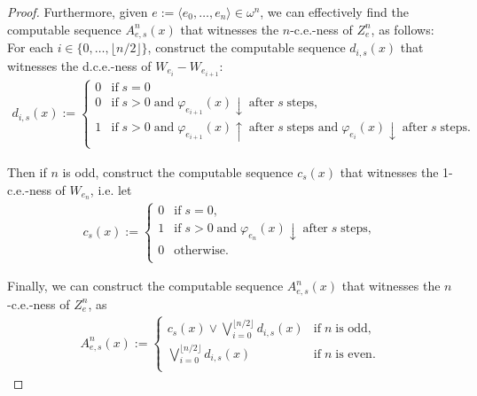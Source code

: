 \documentclass{article}
\begin{document}
\begin{enumerate}[label={\bf Q\arabic*:}]
\begin{proof}
      Furthermore, given $e:=\langle e_0,\ldots,e_{n}\rangle\in
      \omega^{n}$, we can effectively find the computable sequence
      $A_{e,s}^n(x)$ that witnesses the $n$-c.e.-ness of $Z_e^n$, as
      follows: For each $i\in\{0,\ldots,\lfloor n/2\rfloor\}$, construct
      the computable sequence $d_{i,s}(x)$ that witnesses the d.c.e.-ness
      of $W_{e_i}-W_{e_{i+1}}$:
      \begin{align*}
        d_{i,s}(x) :=
        \begin{cases}
          0 &\text{if}\; s=0\\
          0 &\text{if}\; s>0\; \text{and}\; \varphi_{e_{i+1}}(x)\downarrow\;
            \text{after}\; s\; \text{steps},\\
          1 &\text{if}\; s>0\; \text{and}\; \varphi_{e_{i+1}}(x)\uparrow\;
            \text{after}\; s\; \text{steps and}\; \varphi_{e_i}(x)\downarrow\;
            \text{after}\; s\; \text{steps}.\\
        \end{cases}
      \end{align*}

      Then if $n$ is odd, construct the computable sequence $c_s(x)$ that
      witnesses the 1-c.e.-ness of $W_{e_n}$, i.e. let
      \begin{align*}
        c_{s}(x) :=
        \begin{cases}
          0 &\text{if}\; s=0,\\
          1 &\text{if}\; s>0\; \text{and}\; \varphi_{e_n}(x)\downarrow\;
            \text{after}\; s\; \text{steps},\\
          0 &\text{otherwise}.\\
        \end{cases}
      \end{align*}

      Finally, we can construct the computable sequence
      $A_{e,s}^n(x)$ that witnesses the $n$-c.e.-ness of $Z_e^n$, as
      \begin{align*}
        A_{e,s}^n(x) :=
        \begin{cases}
          c_s(x) \vee \bigvee_{i=0}^{\lfloor n/2\rfloor} d_{i,s}(x)
            &\text{if}\; n\; \text{is odd},\\
          \bigvee_{i=0}^{\lfloor n/2\rfloor} d_{i,s}(x)
            &\text{if}\; n\; \text{is even}.\\
        \end{cases}
      \end{align*}


\end{proof}
\end{enumerate}
\end{document}
